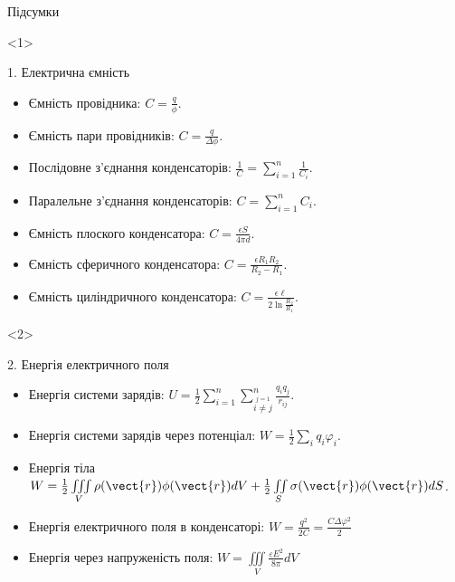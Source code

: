 \documentclass[onlytextwidth]{beamer}
\begin{document}
\begin{frame}{Підсумки}{}
\begin{onlyenv}<1>
\begin{block}{1. Електрична ємність}
        \begin{itemize}
            \item Ємність провідника: $ C = \frac{q}{\phi} $.
            \item Ємність пари провідників: $ C = \frac{q}{\Delta\phi} $.
            \item Послідовне з'єднання конденсаторів: $\frac1C = \sum\limits_{i = 1}^n\frac1{C_i}$.
            \item Паралельне з'єднання конденсаторів: $C = \sum\limits_{i = 1}^n{C_i}$.
            \item Ємність плоского конденсатора: $ C = \frac{\epsilon S}{4\pi d} $.
            \item Ємність сферичного конденсатора: $ C = \frac{\epsilon R_1 R_2}{R_2 - R_1} $.
            \item Ємність циліндричного конденсатора: $ C = \frac{\epsilon \ell}{2 \ln
            \frac{R_2}{R_1}} $.
        \end{itemize}
    \end{block}
\end{onlyenv}
\begin{onlyenv}<2>
    \begin{block}{2. Енергія електричного поля}
        \begin{itemize}
            \item Енергія системи зарядів: $
            			U = \frac12\sum\limits_{i = 1}^n\sum\limits_{\stackrel{j = 1}{i \neq j}}^n
            			\frac{q_iq_j}{r_{ij}}
            		$.
            \item Енергія системи зарядів через потенціал: $ W = \frac{1}{2} \sum_{i} q_i \varphi_i
            $.
            \item Енергія тіла $ W = \frac12 \iiint\limits_V \rho(\vect{r})\phi(\vect{r}) dV +
            \frac12
				\iint\limits_S
				\sigma(\vect{r})\phi(\vect{r}) dS $.
            \item Енергія електричного поля в конденсаторі: $ W = \frac{q^2}{2C} = \frac{C \Delta
            \varphi^2}{2} $
            \item Енергія через напруженість поля: $ W = \iiint\limits_V\frac{\varepsilon
            E^2}{8\pi} dV $
        \end{itemize}

\end{block}
\end{onlyenv}
\end{frame}
\end{document}
